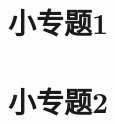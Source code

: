 \documentclass[color=green]{textbook-cn}%
\begin{document}
\begin{Topic}

\section{小专题1}


\Example{\zhlipsum[1]}

\subsection{}
\subsection{  }



\begin{Exercise}
	\lipsum[2]
\end{Exercise}

\begin{Thinking}
	\lipsum[2]
\end{Thinking}


\begin{Improve}
	\lipsum[2]
\end{Improve}




\makeatletter

\makeatother



\zhlipsum


\section{小专题2}


\Example{\zhlipsum[1]}


\Example{\zhlipsum[2]}

	
\end{Topic}
\end{document}
